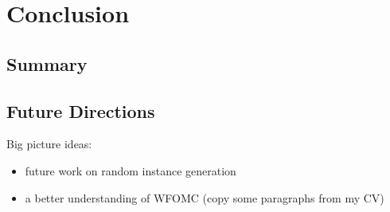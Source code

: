 \chapter{Conclusion} \label{chapter:conclusion}

\section{Summary}

\section{Future Directions}

Big picture ideas:
\begin{itemize}
\item future work on random instance generation
\item a better understanding of WFOMC (copy some paragraphs from my CV)
\end{itemize}
